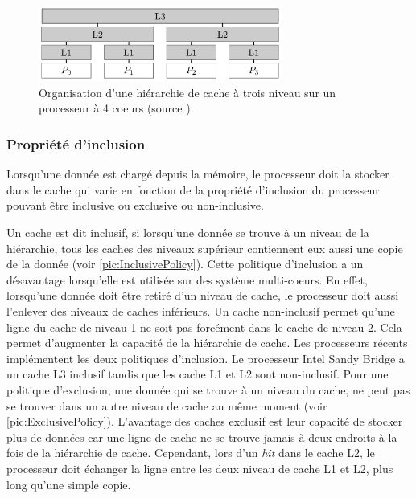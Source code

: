 \begin{figure}
    \center
    \includegraphics[width=8cm]{images/cache_hierarchy.png}
    \caption{\label{pic:cache_hierarchy} Organisation d'une hiérarchie de cache à trois niveau sur un processeur à 4 coeurs (source \cite{putigny2014benchmark}).}
\end{figure}




\subsubsection{Propriété d'inclusion}
Lorsqu'une donnée est chargé depuis la mémoire, le processeur doit la stocker dans le cache qui varie en fonction de la propriété d'inclusion du processeur pouvant être inclusive ou exclusive ou non-inclusive.

Un cache est dit inclusif, si lorsqu'une donnée se trouve à un niveau de la hiérarchie, tous les caches des niveaux supérieur contiennent eux aussi une copie de la donnée (voir \autoref{pic:InclusivePolicy}). Cette politique d'inclusion a un désavantage lorsqu'elle est utilisée sur des système multi-coeurs. En effet, lorsqu'une donnée doit être retiré d'un niveau de cache, le processeur doit aussi l'enlever des niveaux de caches inférieurs.  Un cache non-inclusif permet qu'une ligne du cache de niveau 1 ne soit pas forcément dans le cache de niveau 2. Cela permet d'augmenter la capacité de la hiérarchie de cache. Les processeurs récents implémentent les deux politiques d'inclusion. Le processeur Intel Sandy Bridge a un cache L3 inclusif tandis que les cache L1 et L2 sont non-inclusif. Pour une politique d'exclusion, une donnée qui se trouve à un niveau du cache, ne peut pas se trouver dans un autre niveau de cache au même moment (voir \autoref{pic:ExclusivePolicy}). L'avantage des caches exclusif est leur capacité de stocker plus de données car une ligne de cache ne se trouve jamais à deux endroits à la fois de la hiérarchie de cache. Cependant, lors d'un \textit{hit} dans le cache L2, le processeur doit échanger la ligne entre les deux niveau de cache L1 et L2, plus long qu'une simple copie.




